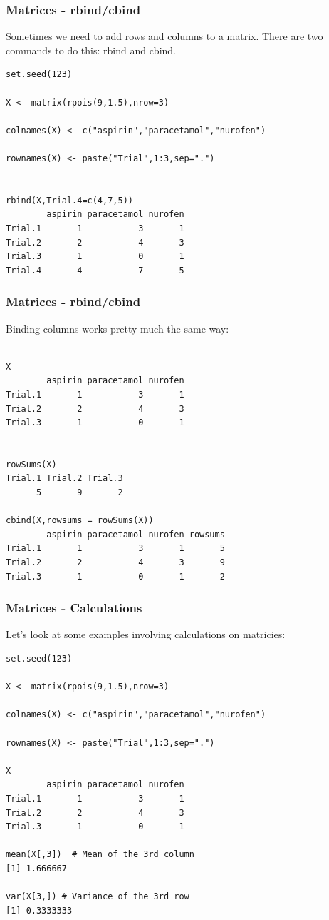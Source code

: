 \documentclass{beamer}
\begin{document}
%

\begin{frame}[fragile]
\frametitle{Matrices - rbind/cbind}
Sometimes we need to add rows and columns to a matrix. There are two commands to do this: rbind and cbind. 
\footnotesize
\begin{verbatim}
set.seed(123) 

X <- matrix(rpois(9,1.5),nrow=3)

colnames(X) <- c("aspirin","paracetamol","nurofen")

rownames(X) <- paste("Trial",1:3,sep=".")

 
rbind(X,Trial.4=c(4,7,5))
        aspirin paracetamol nurofen
Trial.1       1           3       1
Trial.2       2           4       3
Trial.3       1           0       1
Trial.4       4           7       5

\end{verbatim}
\end{frame}

%

\begin{frame}[fragile]
\frametitle{Matrices - rbind/cbind}
Binding columns works pretty much the same way:
\footnotesize
\begin{verbatim}

X
        aspirin paracetamol nurofen
Trial.1       1           3       1
Trial.2       2           4       3
Trial.3       1           0       1


rowSums(X)
Trial.1 Trial.2 Trial.3 
      5       9       2 

cbind(X,rowsums = rowSums(X))
        aspirin paracetamol nurofen rowsums
Trial.1       1           3       1       5
Trial.2       2           4       3       9
Trial.3       1           0       1       2

\end{verbatim}
\end{frame}

%

\begin{frame}[fragile]
\frametitle{Matrices - Calculations}
Let's look at some examples involving calculations on matricies:
\footnotesize
\begin{verbatim}
set.seed(123) 

X <- matrix(rpois(9,1.5),nrow=3)

colnames(X) <- c("aspirin","paracetamol","nurofen")

rownames(X) <- paste("Trial",1:3,sep=".")

X
        aspirin paracetamol nurofen
Trial.1       1           3       1
Trial.2       2           4       3
Trial.3       1           0       1

mean(X[,3])  # Mean of the 3rd column
[1] 1.666667

var(X[3,]) # Variance of the 3rd row
[1] 0.3333333
\end{verbatim}
\end{frame}
\end{document}
